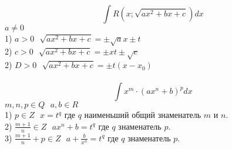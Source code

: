 \\
\[\int R \left(x; \sqrt{ax^2 + bx + c} \right)dx\]
$a \neq 0$\\
1) $a > 0 ~~~ \sqrt{ax^2 + bx + c} = \pm \sqrt{a}x \pm t$\\
2) $c > 0 ~~~ \sqrt{ax^2 + bx + c} = \pm xt \pm \sqrt{c}$\\
2) $D > 0 ~~~ \sqrt{ax^2 + bx + c} = \pm t (x - x_0)$\\

\\
\[\int x^m \cdot (ax^n + b)^p dx\]
$m, n, p \in Q ~~~ a, b \in R$\\
1) $p \in Z ~~~ x = t^q$ где $q$ наименьший общий знаменатель $m$ и $n$.\\
2) $\frac{m+1}{n} \in Z ~~~ ax^n + b = t^q$ где $q$ знаменатель $p$.\\
3) $\frac{m+1}{n} + p \in Z ~~~ a + \frac{b}{x^n} = t^q$ где $q$ знаменатель
  $p$.\\